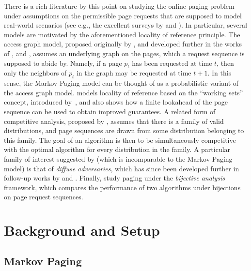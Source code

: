 \documentclass[11pt]{article}
\begin{document}
There is a rich literature by this point on studying the online paging problem under assumptions on the permissible page requests that are supposed to model real-world scenarios (see e.g., the excellent surveys by \cite{irani2005competitive} and \cite{dorrigiv2005survey}). In particular, several models are motivated by the aforementioned locality of reference principle. The access graph model, proposed originally by \cite{borodin1991competitive}, and developed further in the works of \cite{irani1992strongly}, \cite{fiat1995randomized} and \cite{fiat1997truly}, assumes an underlying graph on the pages, which a request sequence is supposed to abide by. Namely, if a page $p_t$ has been requested at time $t$, then only the neighbors of $p_t$ in the graph may be requested at time $t+1$. In this sense, the Markov Paging model can be thought of as a probabilistic variant of the access graph model.
\cite{torng1998unified} models locality of reference based on the ``working sets'' concept, introduced by~\cite{denning1968working}, and also shows how a finite lookahead of the page sequence can be used to obtain improved guarantees. A related form of competitive analysis, proposed by \cite{koutsoupias2000beyond}, assumes that there is a family of valid distributions, and page sequences are drawn from some distribution belonging to this family. The goal of an algorithm is then to be simultaneously competitive with the optimal algorithm for every distribution in the family. A particular family of interest suggested by \cite{koutsoupias2000beyond} (which is incomparable to the Markov Paging model) is that of \textit{diffuse adversaries}, which has since been developed further in follow-up works by \cite{young1998bounding, young2000line} and \cite{becchetti2004modeling}. Finally, \cite{angelopoulos2009paging} study paging under the \textit{bijective analysis} framework, which compares the performance of two algorithms under bijections on page request sequences.




 \section{Background and Setup}
\label{sec:background}



\subsection{Markov Paging}
\label{sec:markov-paging}
\end{document}
